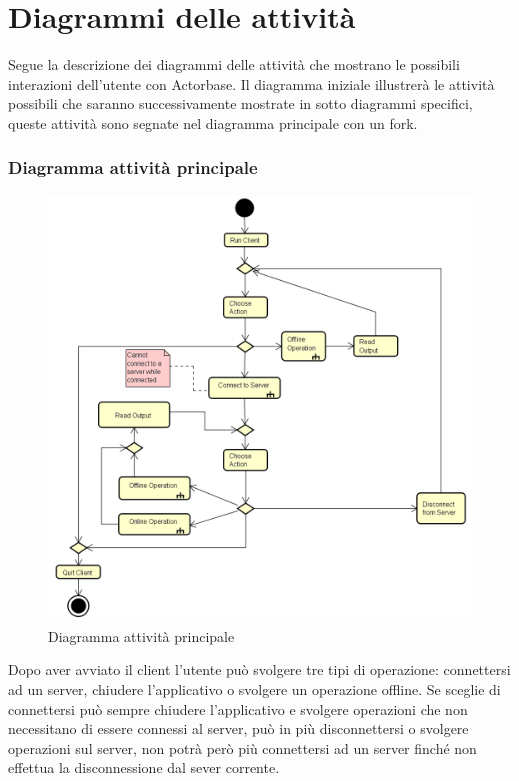 \documentclass[a4paper]{article}
\begin{document}
	\newpage 
	\section{Diagrammi delle attività}
		Segue la descrizione dei diagrammi delle attività che mostrano le possibili interazioni dell'utente con Actorbase. Il diagramma iniziale illustrerà le attività possibili che saranno successivamente mostrate in sotto diagrammi specifici, queste attività sono segnate nel diagramma principale con un fork.
		\subsubsection{Diagramma attività principale}
		
		\begin{figure} [H]
			\centering
			\includegraphics[scale=0.6]{ST/client/diagramma-attivita-generale.png}
			\caption{Diagramma attività principale}
		\end{figure}
			Dopo aver avviato il client l'utente può svolgere tre tipi di operazione: connettersi ad un server, chiudere l'applicativo o svolgere un operazione offline. Se sceglie di connettersi può sempre chiudere l'applicativo e svolgere operazioni che non necessitano di essere connessi al server, può in più disconnettersi o svolgere operazioni sul server, non potrà però più connettersi ad un server finché non effettua la disconnessione dal sever corrente.
			
\end{document}
